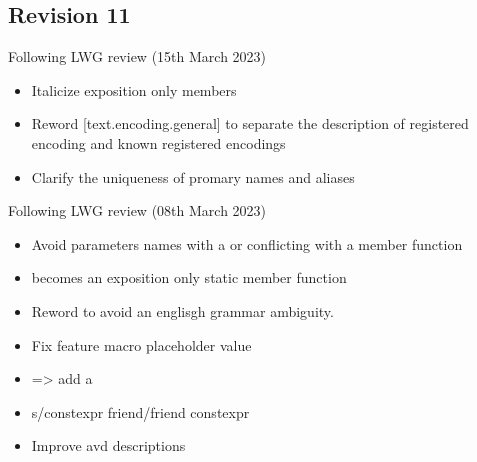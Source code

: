 \documentclass{wg21}
\begin{document}
\subsection*{Revision 11}Following LWG review (15th March 2023)
\begin{itemize}
\item Italicize exposition only members
\item Reword [text.encoding.general] to separate the description of registered encoding and known registered encodings
\item Clarify the uniqueness of promary names and aliases
\end{itemize}
Following LWG review (08th March 2023)
\begin{itemize}
\item Avoid parameters names with a \tcode{_} or conflicting with a member function
\item {} becomes an exposition only static member function  
\item Reword  to avoid an englisgh grammar ambiguity.
\item Fix feature macro placeholder value
\item {} => add a \seebelow
\item s/constexpr friend/friend constexpr
\item Improve  avd  descriptions
\end{itemize}
\end{document}
